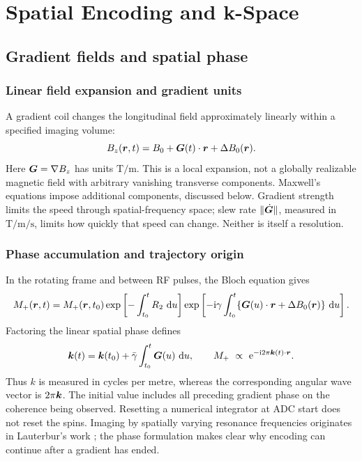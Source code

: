 \chapter{Spatial Encoding and k-Space}
\label{ch:05}
\section{Gradient fields and spatial phase}
\label{sec:05:gradient-fields-and-spatial-phase}
\subsection{Linear field expansion and gradient units}
A gradient coil changes the longitudinal field approximately linearly within a specified imaging volume:
\begin{equation}
 B_z(\bm{r},t)=B_0+\bm{G}(t)\cdot\bm{r}+\Delta B_0(\bm{r}).
 \label{eq:05:field}
\end{equation}
Here \(\bm{G}=\nabla B_z\) has units \(\si{\tesla\per\metre}\).
This is a local expansion, not a globally realizable magnetic field with arbitrary vanishing transverse components. Maxwell's equations impose additional components, discussed below. Gradient strength limits the speed through spatial-frequency space; slew rate \(\lVert\dot{\bm{G}}\rVert\), measured in \(\si{\tesla\per\metre\per\second}\), limits how quickly that speed can change. Neither is itself a resolution.

\subsection{Phase accumulation and trajectory origin}
In the rotating frame and between RF pulses, the Bloch equation gives
\begin{equation}
 M_+(\bm{r},t)=M_+(\bm{r},t_0)
 \exp\left[-\int_{t_0}^t R_2\,\mathop{}\!\mathrm{d} u\right]
 \exp\left[-\mathrm{i}\gamma\int_{t_0}^t
   \{\bm{G}(u)\cdot\bm{r}+\Delta B_0(\bm{r})\}\,\mathop{}\!\mathrm{d} u\right].
\end{equation}
Factoring the linear spatial phase defines
\begin{equation}
 \bm{k}(t)=\bm{k}(t_0)+\bar{\gamma}\int_{t_0}^t\bm{G}(u)\,\mathop{}\!\mathrm{d} u,
 \qquad M_+\ \propto\ \mathrm{e}^{-\mathrm{i}2\pi\bm{k}(t)\cdot\bm{r}}.
 \label{eq:05:trajectory}
\end{equation}
Thus \(k\) is measured in cycles per metre, whereas the corresponding angular wave vector is \(2\pi\bm{k}\). The initial value includes all preceding gradient phase on the coherence being observed. Resetting a numerical integrator at ADC start does not reset the spins. Imaging by spatially varying resonance frequencies originates in Lauterbur's work \cite{lauterbur1973}; the phase formulation makes clear why encoding can continue after a gradient has ended.

